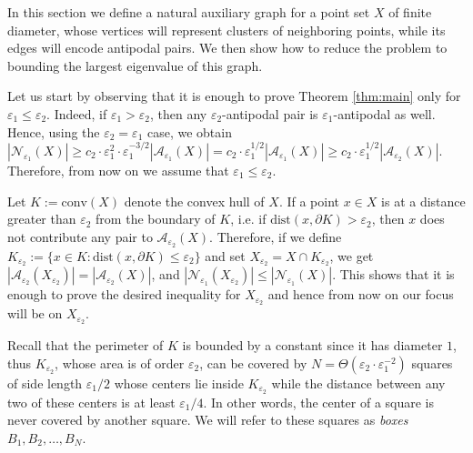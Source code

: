 \documentclass[12pt]{article}
\newcommand{\eps}{\varepsilon}
\begin{document}
    In this section we define a natural auxiliary graph for a point set $X$ of finite diameter, whose vertices will represent clusters of neighboring points, while its edges will encode antipodal pairs. We then show how to reduce the problem to bounding the largest eigenvalue of this graph. 
    
    Let us start by observing that it is enough to prove Theorem \ref{thm:main} only for $\eps_1\leq \eps_2$. Indeed, if $\eps_1>\eps_2$, then any $\eps_2$-antipodal pair is $\eps_1$-antipodal as well. Hence, using the $\eps_2=\eps_1$ case, we obtain $\left|\mathcal{N}_{\eps_1}(X)\right|\geq  c_2\cdot \eps_1^{2}\cdot\eps_1^{-3/2}\left|\mathcal{A}_{\eps_1}(X)\right| = c_2\cdot \eps_1^{1/2}\left|\mathcal{A}_{\eps_1}(X)\right|\geq c_2\cdot \eps_1^{1/2}\left|\mathcal{A}_{\eps_2}(X)\right|$. Therefore, from now on we assume that $\eps_1\le\eps_2$.




Let $K:=\text{conv}(X)$ denote the convex hull of $X$. If a point $x\in X$ is at a distance greater than $\varepsilon_2$ from the boundary of $K$, i.e. if $\text{dist}(x,\partial K)>\varepsilon_2$, then $x$ does not contribute  any pair to $\mathcal{A}_{\eps_2}(X)$. Therefore, if we define $K_{\eps_2}:=\{x\in K:\text{dist}(x,\partial K)\le {\eps_2}\}$ and set $X_{\eps_2}=X\cap K_{\eps_2}$, we get $|\mathcal{A}_{\eps_2}(X_{\eps_2})|=|\mathcal{A}_{\eps_2}(X)|$, and $|\mathcal{N}_{\eps_1}(X_{\eps_2})|\leq |\mathcal{N}_{\eps_1}(X)|$. This shows that it is enough to prove the desired inequality for $X_{\eps_2}$ and hence from now on our focus will be on $X_{\eps_2}$. 

Recall that the perimeter of $K$ is bounded by a constant since it has diameter $1$, thus $K_{\eps_2}$, whose area is of order $\eps_2$, can be covered by $N=\Theta \left(\varepsilon_2\cdot\varepsilon_1^{-2}\right)$ squares of side length $\eps_1/2$ whose centers lie inside $K_{\eps_2}$ while the distance between any two of these centers is at least $\eps_1/4$. In other words, the center of a square is never covered by another square. We will refer to these squares as \emph{boxes} $B_1,B_2,\ldots,B_N$.%
\end{document}
